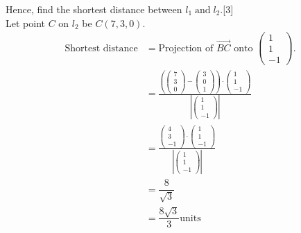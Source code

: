 \documentclass[12pt, a4 paper]{article}
\begin{document}
\begin{outline}[enumerate]
					\color{black}
					\2 Hence, find the shortest distance between ${l_1}\;{\textrm{and}}\;{l_2}$.\hfill[3]
					\color{blue}
					\\{\textrm{Let point }}$C${\textrm{ on }}${l_2}${\textrm{ be }}$C(7,3,0)$.
					\begin{align*}
						\textrm{Shortest distance} & =  \textrm{Projection of }\overrightarrow {BC} {\textrm{ onto }}\left( {\begin{array}{*{20}{c}}1 \\1\\{ - 1}\end{array}} \right).\\ &= \frac{{\left( {\left( {\begin{array}{*{20}{c}}7\\3\\0\end{array}} \right) - \left( {\begin{array}{*{20}{c}}3\\0\\1\end{array}} \right)} \right) \cdot \left( {\begin{array}{*{20}{c}}1\\1\\{ - 1}\end{array}} \right)}}{{\left| {\left( {\begin{array}{*{20}{c}}1\\1\\{ - 1}\end{array}} \right)} \right|}}\\ &= \frac{{\left( {\begin{array}{*{20}{c}}4\\3\\{ - 1}\end{array}} \right) \cdot \left( {\begin{array}{*{20}{c}}1\\1\\{ - 1}\end{array}} \right)}}{{\left| {\left( {\begin{array}{*{20}{c}}1\\1\\{ - 1}\end{array}} \right)} \right|}}\\ &= \dfrac{8}{{\sqrt 3 }}\\ &= \dfrac{{8\sqrt {3} }}{{3}}{\textrm{units}}
					\end{align*}


\end{outline}
\end{document}
